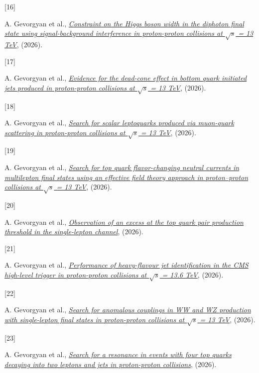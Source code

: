 \documentclass[
]{article}
\newlength{\cslhangindent}
\newlength{\csllabelwidth}
\newenvironment{CSLReferences}[2] %
 {\begin{list}{}{%
  \setlength{\itemindent}{0pt}
  \setlength{\leftmargin}{0pt}
  \setlength{\parsep}{0pt}
  \ifodd #1
   \setlength{\leftmargin}{\cslhangindent}
   \setlength{\itemindent}{-1\cslhangindent}
  \fi
  \setlength{\itemsep}{#2\baselineskip}}}
 {\end{list}}
\newcommand{\CSLLeftMargin}[1]{\parbox[t]{\csllabelwidth}{\strut#1\strut}}
\newcommand{\CSLRightInline}[1]{\parbox[t]{\linewidth - \csllabelwidth}{\strut#1\strut}}
\begin{document}
\begin{CSLReferences}{0}{0}
\CSLLeftMargin{{[}16{]} }%
\CSLRightInline{A. Gevorgyan et al.,
\emph{\href{https://arxiv.org/abs/2609.01385}{{Constraint on the Higgs
boson width in the diphoton final state using signal-background
interference in proton-proton collisions at \(\sqrt{s}\) = 13 TeV}}},
(2026).}

\CSLLeftMargin{{[}17{]} }%
\CSLRightInline{A. Gevorgyan et al.,
\emph{\href{https://arxiv.org/abs/2608.29412}{{Evidence for the
dead-cone effect in bottom quark initiated jets produced in
proton-proton collisions at \(\sqrt{s}\) = 13 TeV}}}, (2026).}

\CSLLeftMargin{{[}18{]} }%
\CSLRightInline{A. Gevorgyan et al.,
\emph{\href{https://arxiv.org/abs/2608.28377}{{Search for scalar
leptoquarks produced via muon-quark scattering in proton-proton
collisions at \(\sqrt{s}\) = 13 TeV}}}, (2026).}

\CSLLeftMargin{{[}19{]} }%
\CSLRightInline{A. Gevorgyan et al.,
\emph{\href{https://arxiv.org/abs/2608.19547}{{Search for top quark
flavor-changing neutral currents in multilepton final states using an
effective field theory approach in proton--proton collisions at
\(\sqrt{s}\) = 13 TeV}}}, (2026).}

\CSLLeftMargin{{[}20{]} }%
\CSLRightInline{A. Gevorgyan et al.,
\emph{\href{https://arxiv.org/abs/2608.19546}{{Observation of an excess
at the top quark pair production threshold in the single-lepton
channel}}}, (2026).}

\CSLLeftMargin{{[}21{]} }%
\CSLRightInline{A. Gevorgyan et al.,
\emph{\href{https://arxiv.org/abs/2608.18331}{{Performance of
heavy-flavour jet identification in the CMS high-level trigger in
proton-proton collisions at \(\sqrt{s}\) = 13.6 TeV}}}, (2026).}

\CSLLeftMargin{{[}22{]} }%
\CSLRightInline{A. Gevorgyan et al.,
\emph{\href{https://arxiv.org/abs/2608.18245}{{Search for anomalous
couplings in WW and WZ production with single-lepton final states in
proton-proton collisions at \(\sqrt{s}\) = 13 TeV}}}, (2026).}

\CSLLeftMargin{{[}23{]} }%
\CSLRightInline{A. Gevorgyan et al.,
\emph{\href{https://arxiv.org/abs/2608.10148}{{Search for a resonance in
events with four top quarks decaying into two leptons and jets in
proton-proton collisions}}}, (2026).}


\end{CSLReferences}
\end{document}
